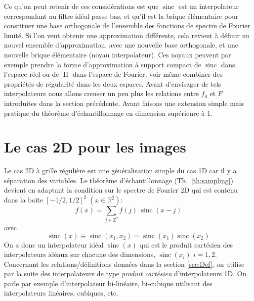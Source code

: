 \documentclass[11pt,twoside]{article}
\DeclareMathOperator{\sinc}{sinc}
\DeclareMathOperator{\boxcar}{{\mbox{$\Pi$}}}
\begin{document}
Ce qu'on peut retenir de ces considérations est que $\sinc$ est un interpolateur correspondant au filtre idéal passe-bas, et qu'il est la brique élémentaire pour constituer une base orthogonale de l'ensemble des fonctions de spectre de Fourier limité. Si l'on veut obtenir une approximation différente, cela revient à définir un nouvel ensemble d'approximation, avec une nouvelle base orthogonale, et une nouvelle brique élémentaire (noyau interpolateur). Ces noyaux peuvent par exemple prendre la forme d'approximation à support compact de $\sinc$ dans l'espace réel ou de $\boxcar$ dans l'espace de Fourier, voir même combiner des propriétés de régularité dans les deux espaces. Avant d'envisager de tels interpolateurs nous allons creuser un peu plus les relations entre $f_d$ et $F$ introduites dans la section précédente. Avant faisons une extension simple mais pratique du théorème d'échantillonnage en dimension supérieure à 1.
%
\section{Le cas 2D pour les images}
\label{sec:2D}
%
Le cas 2D à grille régulière est une généralisation simple du cas 1D car il y a séparation des variables. Le théorème d'échantillonnage (Th.~\ref{th:sampling}) devient en adaptant la condition sur le spectre de Fourier 2D qui est contenu dans la boite $[-1/2,1/2]^2$  $(x\in\mathbb{R}^2)$:
\begin{equation}
f(x) = \sum_{j\in\mathbb{Z}^2} f(j)\ \sinc(x-j)
\end{equation}
avec
\begin{equation}
\sinc(x)\equiv \sinc(x_1,x_2) = \sinc(x_1)\sinc(x_2)
\end{equation}
On a donc un interpolateur idéal $\sinc(x)$ qui est le produit cartésien des interpolateurs idéaux sur chacune des dimensions, $\sinc(x_i)$ $i=1,2$. Concernant les relations/définitions données dans la section \ref{sec:Def}, on utilise par la suite des interpolateurs de type \textit{produit cartésien} d'interpolateurs 1D. On parle par exemple d'interpolateur  bi-linéaire, bi-cubique utilisant des interpolateurs linéaires, cubiques, etc. 
%
\end{document}
